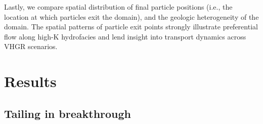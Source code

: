 Lastly, we compare %
spatial distribution of final particle positions (i.e., the location at which particles exit the domain), and the geologic heterogeneity of the domain. The spatial patterns of particle exit points strongly illustrate preferential flow along high-K hydrofacies and lend insight into transport dynamics across VHGR scenarios.







\section{Results}
\label{s_3}



%
%

\subsection{Tailing in breakthrough}
\label{ss_3_1}

